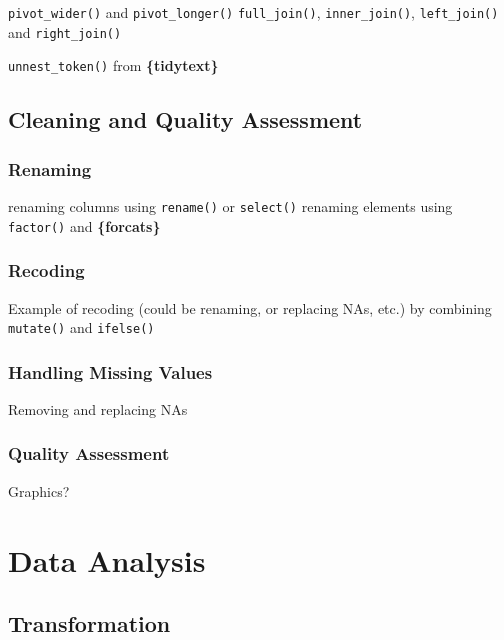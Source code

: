 \documentclass[
]{book}
\begin{document}
\texttt{pivot\_wider()} and \texttt{pivot\_longer()}
\texttt{full\_join()}, \texttt{inner\_join()}, \texttt{left\_join()} and \texttt{right\_join()}

\texttt{unnest\_token()} from \textbf{\{tidytext\}}

\hypertarget{cleaning-and-quality-assessment}{%
\section{Cleaning and Quality Assessment}\label{cleaning-and-quality-assessment}}

\hypertarget{renaming}{%
\subsection{Renaming}\label{renaming}}

renaming columns using \texttt{rename()} or \texttt{select()}
renaming elements using \texttt{factor()} and \textbf{\{forcats\}}

\hypertarget{recoding}{%
\subsection{Recoding}\label{recoding}}

Example of recoding (could be renaming, or replacing NAs, etc.) by combining \texttt{mutate()} and \texttt{ifelse()}

\hypertarget{handling-missing-values}{%
\subsection{Handling Missing Values}\label{handling-missing-values}}

Removing and replacing NAs

\hypertarget{quality-assessment}{%
\subsection{Quality Assessment}\label{quality-assessment}}

Graphics?

\hypertarget{data_analysis}{%
\chapter{Data Analysis}\label{data_analysis}}

\hypertarget{transformation}{%
\section{Transformation}\label{transformation}}
\end{document}
